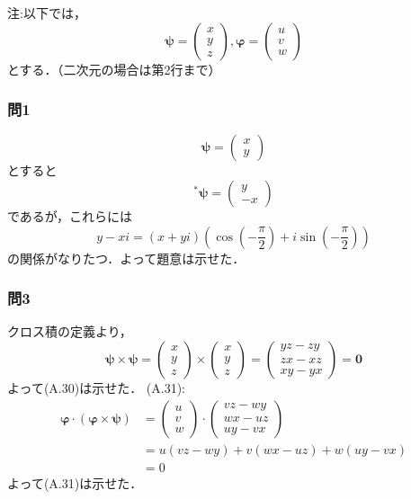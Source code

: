 \documentclass[dvipdfmx,uplatex]{jsarticle}
\begin{document}
注:以下では，
\[
	\bm{\psi} = 
		\begin{pmatrix}
		x\\
		y\\
		z
		\end{pmatrix},
	\bm{\varphi} =
		\begin{pmatrix}
		u\\
		v\\
		w
		\end{pmatrix}
\]
とする．（二次元の場合は第2行まで）

\subsubsection{問1}
\[
	\bm{\psi} = 
		\begin{pmatrix}
		x \\
		y	
		\end{pmatrix}
\]
とすると
\[
	^* \bm{\psi} = 
		\begin{pmatrix}
		y\\
		-x	
		\end{pmatrix}
\]
であるが，これらには
\[
	y-xi = (x+yi) \left( \cos \left(-\frac{\pi}{2}\right)+i \sin \left(-\frac{\pi}{2}\right)\right)
\]
の関係がなりたつ．よって題意は示せた．

\subsubsection{問3}
クロス積の定義より，
\[
	\bm{\psi} \times \bm{\psi} = 
		\begin{pmatrix}
		x\\
		y\\
		z
		\end{pmatrix}
	\times
		\begin{pmatrix}
		x\\
		y\\
		z
		\end{pmatrix} =	
		\begin{pmatrix}
		yz-zy\\
		zx-xz\\
		xy-yx
		\end{pmatrix}
		= \bm{0}
\]
よって(A.30)は示せた．
(A.31):
\begin{align*}
	\bm{\varphi} \cdot ( \bm{\varphi} \times \bm{\psi}) &=
		\begin{pmatrix}
		u\\
		v\\
		w
		\end{pmatrix} \cdot
		\begin{pmatrix}
		vz - wy\\
		wx-uz\\
		uy-vx
		\end{pmatrix} \\
		&= u(vz-wy)+v(wx-uz)+w(uy-vx)\\
		&= 0
\end{align*}
よって(A.31)は示せた．
\end{document}
